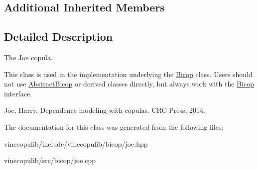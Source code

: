 \subsection*{Additional Inherited Members}


\subsection{Detailed Description}
The Joe copula. 

This class is used in the implementation underlying the \hyperlink{classvinecopulib_1_1_bicop}{Bicop} class. Users should not use \hyperlink{classvinecopulib_1_1_abstract_bicop}{Abstract\+Bicop} or derived classes directly, but always work with the \hyperlink{classvinecopulib_1_1_bicop}{Bicop} interface.

Joe, Harry. Dependence modeling with copulas. C\+R\+C Press, 2014. 

The documentation for this class was generated from the following files\+:\begin{DoxyCompactItemize}
\item 
vinecopulib/include/vinecopulib/bicop/joe.\+hpp\item 
vinecopulib/src/bicop/joe.\+cpp\end{DoxyCompactItemize}
